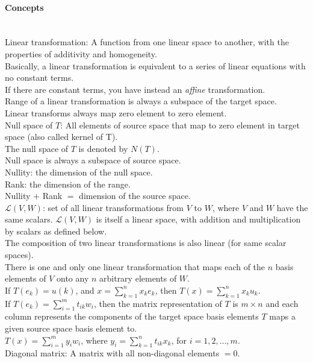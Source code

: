 \documentclass[10pt]{article}
\begin{document}
\paragraph{Concepts}\ \\
Linear transformation: A function from one linear space to another, with the properties of additivity and homogeneity.\\
Basically, a linear transformation is equivalent to a series of linear equations with no constant terms.\\
If there are constant terms, you have instead an {\it affine} transformation.\\
Range of a linear transformation is always a subspace of the target space.\\
Linear transforms always map zero element to zero element.\\
Null space of $T$: All elements of source space that map to zero element in target space (also called kernel of T).\\
The null space of $T$ is denoted by $N(T)$.\\
Null space is always a subspace of source space.\\
Nullity: the dimension of the null space.\\
Rank: the dimension of the range.\\
Nullity $+$ Rank $=$ dimension of the source space.\\
${\mathscr L}(V,W)$: set of all linear transformations from $V$ to $W$, where $V$ and $W$ have the same scalars.
${\mathscr L}(V, W)$ is itself a linear space, with addition and multiplication by scalars as defined below.\\
The composition of two linear transformations is also linear (for same scalar spaces).\\
There is one and only one linear transformation that maps each of the $n$ basis elements of $V$ onto any $n$ arbitrary
elements of $W$.\\
If $T(e_k) = u(k)$, and $x = \sum_{k=1}^n x_k e_k$, then $T(x) = \sum_{k=1}^n x_k u_k$.\\
If $T(e_k) = \sum_{i=1}^m t_{ik} w_i$, then the matrix representation of $T$ is $m \times n$ and each
column represents the components of the target space basis elements $T$ maps a given source space basis
element to.\\
$T(x) = \sum_{i=1}^m y_i w_i$, where $y_i = \sum_{k=1}^n t_{ik} x_k$, for $i = 1, 2, \dotsc, m$.\\
Diagonal matrix: A matrix with all non-diagonal elements $= 0$.\\
\end{document}
